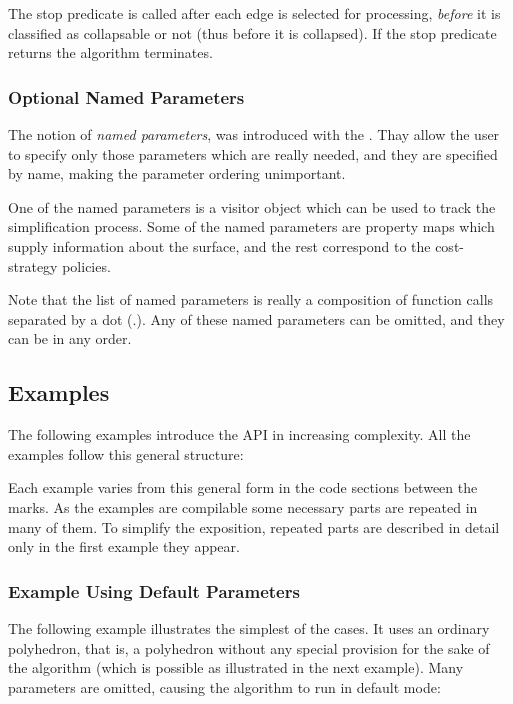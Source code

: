 The stop predicate is called after each edge is selected for processing, {\em before} 
it is classified as collapsable or not (thus before it is collapsed). If the stop predicate 
returns  the algorithm terminates.

\subsubsection{Optional Named Parameters}

The notion of {\em named parameters}, was introduced with the
.
Thay allow the user to specify only those parameters which are really needed,
and they are specified by name, making the parameter ordering unimportant. 

One of the named parameters is a visitor object which can be used to track the simplification 
process. Some of the named parameters are property maps which supply information about 
the surface, and the rest correspond to the cost-strategy policies. 

Note that the list of named parameters is really a composition
of function calls separated by a dot ($.$). Any of these named parameters can be omitted, 
and they can be in any order.



\subsection{Examples}

The following examples introduce the API in increasing complexity. All the examples follow 
this general structure:


Each example varies from this general form in the code sections between 
the marks. As the examples are compilable some necessary parts are repeated 
in many of them. To simplify the exposition, repeated parts are described in detail 
only in the first example they appear.

\subsubsection{Example Using Default Parameters}

The following example illustrates the simplest of the cases. It uses
an ordinary polyhedron, that is, a polyhedron without any special
provision for the sake of the algorithm (which is possible as
illustrated in the next example).  Many parameters are omitted,
causing the algorithm to run in default mode:

